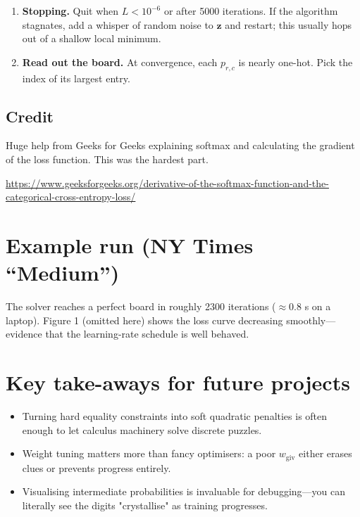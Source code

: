 \documentclass[12pt]{article}
\begin{document}
\begin{enumerate}
    \item \textbf{Stopping.} Quit when $L<10^{-6}$ or after 5000 iterations. If the
          algorithm stagnates, add a whisper of random noise to $\mathbf z$ and
          restart; this usually hops out of a shallow local minimum.
    
    \item \textbf{Read out the board.} At convergence, each $p_{r,c}$ is nearly
          one-hot. Pick the index of its largest entry.
\end{enumerate}

\subsection{Credit}
Huge help from Geeks for Geeks explaining softmax and calculating the gradient of the loss function. This was the hardest part. 

\url{https://www.geeksforgeeks.org/derivative-of-the-softmax-function-and-the-categorical-cross-entropy-loss/}

\section{Example run (NY Times ``Medium'')}

The solver reaches a perfect board in roughly 2300 iterations ($\approx$0.8 s on a
laptop). Figure 1 (omitted here) shows the loss curve decreasing smoothly—evidence
that the learning-rate schedule is well behaved.

\section*{Key take-aways for future projects}
\begin{itemize}
    \item Turning hard equality constraints into soft quadratic penalties is often
          enough to let calculus machinery solve discrete puzzles.
    \item Weight tuning matters more than fancy optimisers: a poor $w_{\text{giv}}$
          either erases clues or prevents progress entirely.
    \item Visualising intermediate probabilities is invaluable for debugging—you can
          literally see the digits "crystallise" as training progresses.
\end{itemize}
\end{document}
